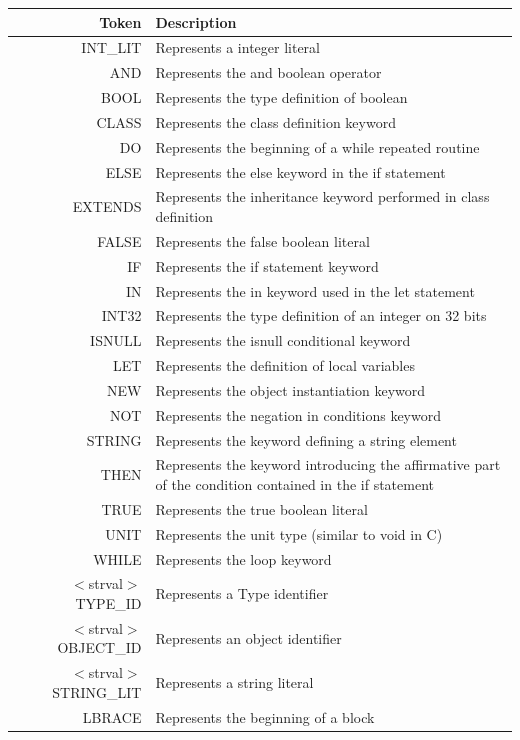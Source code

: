 \documentclass[a4paper,11pt]{article}
\begin{document}
    \begin{table}[hp]
      \centering
      \begin{tabular}{|r|p{10cm}|}
      \hline
      Token & Description\\\hline
      INT\_LIT & Represents a integer literal\\
      AND & Represents the and boolean operator\\
      BOOL &Represents the type definition of boolean \\
      CLASS & Represents the class definition keyword\\
      DO & Represents the beginning of a while repeated routine\\
      ELSE & Represents the else keyword in the if statement\\
      EXTENDS & Represents the inheritance keyword performed in class definition\\
      FALSE & Represents the false boolean literal \\
      IF & Represents the if statement keyword\\
      IN & Represents the in keyword used in  the let statement\\
      INT32 & Represents the type definition of an integer on 32 bits\\
      ISNULL & Represents the isnull conditional keyword\\
      LET & Represents the definition of local variables\\
      NEW & Represents the object instantiation keyword\\
      NOT & Represents the negation in conditions keyword\\
      STRING & Represents the keyword defining a string element\\
      THEN & Represents the keyword introducing the affirmative part of the condition contained in the if statement\\
      TRUE & Represents the true boolean literal\\
      UNIT & Represents the unit type (similar to void in C)\\
      WHILE & Represents the loop keyword\\
      $<$strval$>$ TYPE\_ID & Represents a Type identifier \\
      $<$strval$>$ OBJECT\_ID & Represents an object identifier\\
      $<$strval$>$ STRING\_LIT & Represents a string literal \\
      LBRACE & Represents the beginning of a block\\

\end{tabular}
\end{table}
\end{document}
